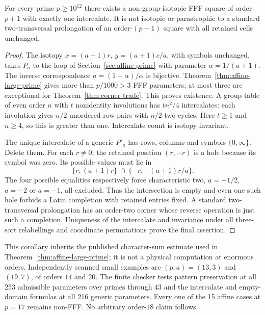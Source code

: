 \begin{corollary}
\label{cor:corner-noncontraction}
For every prime $p\geq10^{12}$ there exists a non-group-isotopic FFF
square of order $p+1$ with exactly one intercalate. It is not isotopic
or parastrophic to a standard two-transversal prolongation of an
order-$(p-1)$ square with all retained cells unchanged.
\end{corollary}

\begin{proof}
The isotopy $x=(a+1)r$, $y=(a+1)c/a$, with symbols unchanged,
takes $P_a$ to the loop of Section~\ref{sec:affine-prime} with parameter
$\alpha=1/(a+1)$. The inverse correspondence
$a=(1-\alpha)/\alpha$ is bijective. Theorem~\ref{thm:affine-large-prime}
gives more than $p/1000>3$ FFF parameters; at most three are exceptional
for Theorem~\ref{thm:corner-trade}. This proves existence.
A group table of even order $n$ with $t$ nonidentity involutions has
$tn^2/4$ intercalates: each involution gives $n/2$ unordered row pairs
with $n/2$ two-cycles. Here $t\geq1$ and $n\geq4$, so this is greater
than one. Intercalate count is isotopy invariant.

The unique intercalate of a generic $P'_a$ has rows, columns and symbols
$\{0,\infty\}$. Delete them. For each $r\ne0$, the retained position
$(r,-r)$ is a hole because its symbol was zero. Its possible values
must lie in
\[
 \{r,(a+1)r\}\ \cap\ \{-r,-(a+1)r/a\}.
\]
The four possible equalities respectively force characteristic two,
$a=-1/2$, $a=-2$ or $a=-1$, all excluded. Thus the intersection is
empty and even one such hole forbids a Latin completion with retained
entries fixed. A standard two-transversal prolongation has an order-two
corner whose reverse operation is just such a completion. Uniqueness
of the intercalate and invariance under all three-sort relabellings and
coordinate permutations prove the final assertion.
\end{proof}

This corollary inherits the published character-sum estimate used in
Theorem~\ref{thm:affine-large-prime}; it is not a physical computation
at enormous orders. Independently scanned small examples are
$(p,a)=(13,3)$ and $(19,7)$, of orders $14$ and $20$. The finite
checker tests pattern preservation at all 253 admissible parameters
over primes through $43$ and the intercalate and empty-domain formulas
at all 216 generic parameters. Every one of the 15 affine cases at
$p=17$ remains non-FFF. No arbitrary order-$18$ claim follows.

